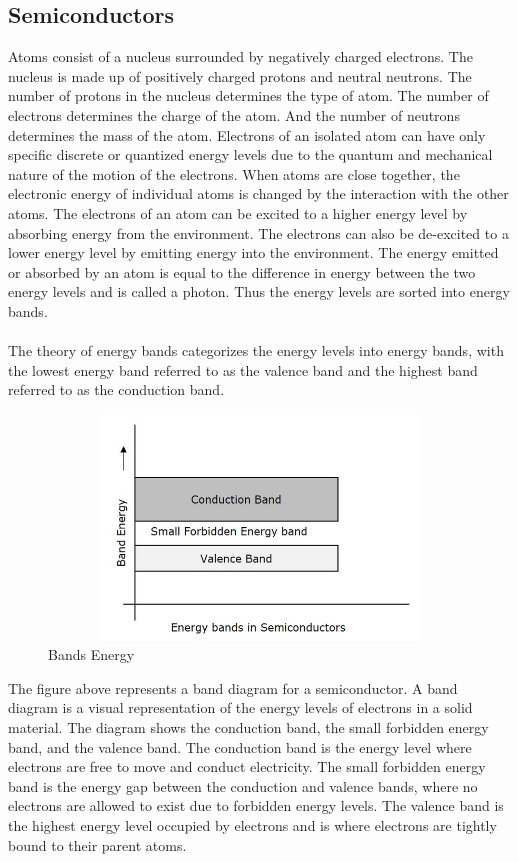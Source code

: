 \documentclass{report}
\begin{document}
\subsection{Semiconductors}
Atoms consist of a nucleus surrounded by negatively charged electrons. The nucleus is made up of positively charged protons and neutral neutrons. The number of protons in the nucleus determines the type of atom. The number of electrons determines the charge of the atom. And the number of neutrons determines the mass of the atom. Electrons of an isolated atom can have only specific discrete or quantized energy levels  due to the quantum and mechanical nature of the motion of the electrons. When atoms are close together, the electronic energy of individual atoms is changed by the interaction with the other atoms. The electrons of an atom can be excited to a higher energy level by absorbing energy from the environment. The electrons can also be de-excited to a lower energy level by emitting energy into the environment. The energy emitted or absorbed by an atom is equal to the difference in energy between the two energy levels and is called a photon. Thus the energy levels are sorted into energy bands\cite{atom}.\\
\\
The theory of energy bands categorizes the energy levels into energy bands, with the lowest energy band referred to as the valence band and the highest band referred to as the conduction band.
\newpage
\begin{figure}[h!]
    \centering
    \includegraphics[width=12cm, height=6cm] {semiconductors.png}
    \caption{Bands Energy\cite{semfig}}
    \label{fig:my_label}
\end{figure}
\hfill \break
The figure above represents a band diagram for a semiconductor. A band diagram is a visual representation of the energy levels of electrons in a solid material. The diagram shows the conduction band, the small forbidden energy band, and the valence band. The conduction band is the energy level where electrons are free to move and conduct electricity. The small forbidden energy band is the energy gap between the conduction and valence bands, where no electrons are allowed to exist due to forbidden energy levels. The valence band is the highest energy level occupied by electrons and is where electrons are tightly bound to their parent atoms.\\
\end{document}
